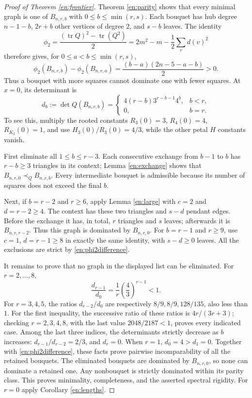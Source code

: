 \documentclass[12pt]{amsart}
\theoremstyle{definition}
\theoremstyle{remark}
\numberwithin{equation}{section}
\DeclareMathOperator{\tr}{tr}
\begin{document}
\begin{proof}[Proof of Theorem \ref{en:frontier}]
Theorem \ref{en:parity} shows that every minimal graph is one of
$B_{n,r,b}$ with $0\le b\le\min(r,s)$. Each bouquet has hub degree
$n-1-b$, $2r+b$ other vertices of degree $2$, and $s-b$ leaves.
The identity
\[
 \phi_2=\frac{(\tr Q)^2-\tr(Q^2)}2
       =2m^2-m-\frac12\sum_vd(v)^2
\]
therefore gives, for $0\le a<b\le\min(r,s)$,
\begin{equation}\label{en:phi2difference}
 \phi_2(B_{n,r,b})-\phi_2(B_{n,r,a})
       =\frac{(b-a)(2n-5-a-b)}2>0.
\end{equation}
Thus a bouquet with more squares cannot dominate one with fewer squares.
At $x=0$, its determinant is
\begin{equation}\label{en:det}
 d_b:=\det Q(B_{n,r,b})=
 \begin{cases}4(r-b)3^{r-b-1}4^b,&b<r,\\0,&b=r.
 \end{cases}
\end{equation}
To see this, multiply the rooted constants $R_3(0)=3$, $R_4(0)=4$,
$R_{K_2}(0)=1$, and use $H_3(0)/R_3(0)=4/3$, while the other petal
$H$ constants vanish.

First eliminate all $1\le b\le r-3$. Each consecutive exchange from
$b-1$ to $b$ has $r-b\ge3$ triangles in its context; Lemma
\ref{en:exchange} shows that $B_{n,r,0}\prec_Q B_{n,r,b}$.
Every intermediate bouquet is admissible because its number of squares
does not exceed the final $b$.

Next, if $b=r-2$ and $r\ge6$, apply Lemma \ref{en:large} with
$c=2$ and $d=r-2\ge4$. The context has these two triangles and
$s-d$ pendant edges. Before the exchange it has, in total, $r$ triangles
and $s$ leaves; afterwards it is $B_{n,r,r-2}$. Thus this graph is
dominated by $B_{n,r,0}$. For $b=r-1$ and $r\ge9$, use $c=1$,
$d=r-1\ge8$ in exactly the same identity, with $s-d\ge0$ leaves.
All the exclusions are strict by \eqref{en:phi2difference}.

It remains to prove that no graph in the displayed list can be eliminated.
For $r=2,\ldots,8$,
\[
 \frac{d_{r-1}}{d_0}=\frac1r\left(\frac43\right)^{r-1}<1.
\]
For $r=3,4,5$, the ratios $d_{r-2}/d_0$ are respectively
$8/9,8/9,128/135$, also less than $1$.
For the first inequality, the successive ratio of these ratios is
$4r/(3r+3)$; checking $r=2,3,4,8$, with the last value
$2048/2187<1$, proves every indicated case. Among the last three
indices, the determinants strictly decrease as $b$ increases:
$d_{r-1}/d_{r-2}=2/3$, and $d_r=0$. When $r=1$, $d_0=4>d_1=0$.
Together with \eqref{en:phi2difference}, these facts prove pairwise
incomparability of all the retained bouquets. The eliminated bouquets
are dominated by $B_{n,r,0}$, so none can dominate a retained one.
Any nonbouquet is strictly dominated within its parity class. This
proves minimality, completeness, and the asserted spectral rigidity.
For $r=0$ apply Corollary \ref{en:lengths}.
\end{proof}
\end{document}
